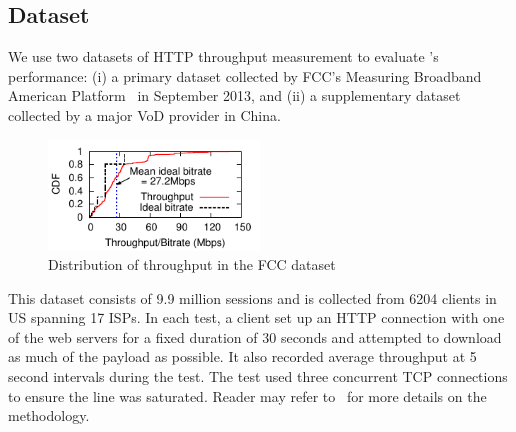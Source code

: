 \subsection{Dataset}
\label{subsec:dataset}

We use two datasets of HTTP throughput measurement to evaluate \name's performance: (i) a primary dataset collected by FCC's Measuring Broadband American Platform~\cite{fcc-2014} in September 2013, and (ii) a supplementary dataset collected by a major VoD provider in China. 

\begin{figure}[t!]
\centering
\includegraphics[width=0.5\textwidth]{figures/dda-cdf-throughput-fcc.pdf}
\caption{Distribution of throughput in the FCC dataset}
\label{fig:cdf-throughput}
\end{figure}

 This dataset consists of 9.9 million sessions and is collected from 6204 clients in US spanning 17 ISPs. In each test, a client set up an HTTP connection with one of the web servers for a fixed duration of 30 seconds and attempted to download as much of the payload as possible. It also recorded average throughput at 5 second intervals during the test. 
The test used three concurrent TCP connections to ensure the line was saturated. 
Reader may refer to~\cite{fcc-methodology} for more details on the methodology. 

